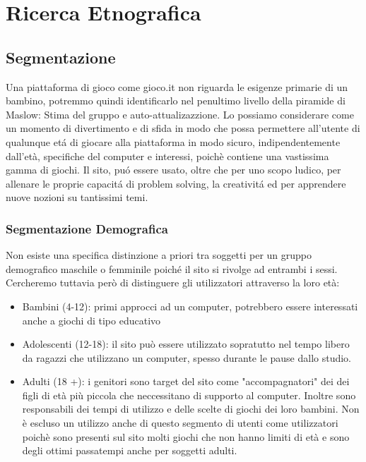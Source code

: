 \documentclass[../Report.tex]{subfiles}
\begin{document}
    \chapter{Ricerca Etnografica}
    \section{Segmentazione}
    Una piattaforma di gioco come gioco.it non riguarda le esigenze primarie di un bambino, potremmo quindi  identificarlo nel penultimo livello della piramide di Maslow: Stima del gruppo e auto-attualizazzione.
    Lo possiamo considerare come un momento di divertimento e di sfida in modo che possa permettere all’utente di qualunque etá di giocare alla piattaforma in modo sicuro, indipendentemente dall’età, specifiche del computer e interessi, poichè contiene una vastissima gamma di giochi. 
    Il sito, puó essere usato, oltre che per uno scopo ludico, per allenare le proprie capacitá di problem solving, la creativitá ed per apprendere nuove nozioni su tantissimi temi.

    \subsection{Segmentazione Demografica}
    
    Non esiste una specifica distinzione a priori tra soggetti per un gruppo demografico maschile o femminile poiché il sito si rivolge ad entrambi i sessi. Cercheremo tuttavia però di distinguere gli utilizzatori attraverso la loro età:
    \begin{itemize}
        \item Bambini (4-12): primi approcci ad un computer, potrebbero essere interessati anche a giochi di tipo educativo
        \item Adolescenti (12-18): il sito può essere utilizzato sopratutto nel tempo libero da ragazzi che utilizzano un computer, spesso durante le pause dallo studio. 
        \item Adulti (18 +): i genitori sono target del sito come "accompagnatori" dei dei figli di età più piccola che neccessitano di supporto al computer. Inoltre sono responsabili dei tempi di utilizzo e delle scelte di giochi dei loro bambini. Non è escluso un utilizzo anche di questo segmento di utenti come utilizzatori poichè sono presenti sul sito molti giochi che non hanno limiti di età e sono degli ottimi passatempi anche per soggetti adulti. 
    \end{itemize}
\end{document}
